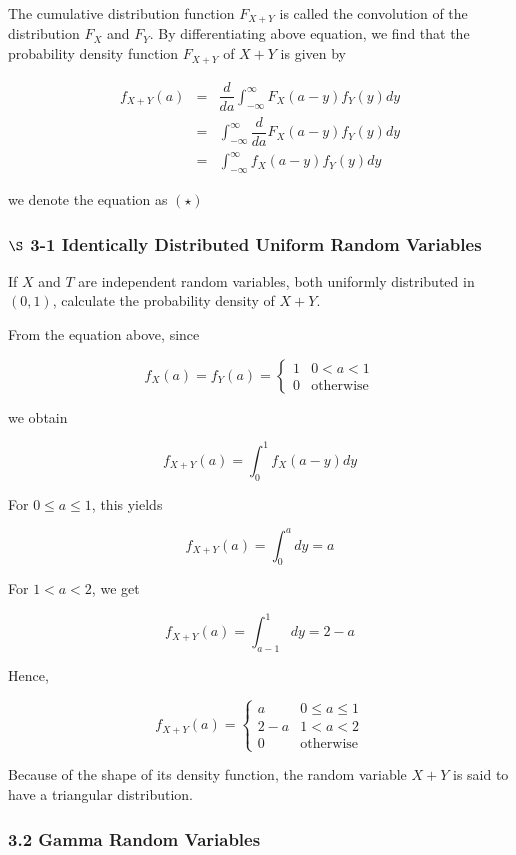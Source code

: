 The cumulative distribution function $F_{X+Y}$ is called the convolution of the distribution $F_X$ and $F_Y$. By differentiating above equation, we find that the probability density function $F_{X + Y}$ of $X + Y$ is given by

\begin{eqnarray*}
	f_{X+Y}(a) &=& \dfrac{d}{da}\int^{\infty}_{-\infty}F_X(a - y)f_Y(y)dy\\
	&=& \int^{\infty}_{-\infty}\dfrac{d}{da}F_X(a-y)f_Y(y)dy\\
	&=& \int^{\infty}_{-\infty}f_X(a-y)f_Y(y)dy
\end{eqnarray*}

we denote the equation as $(\star)$

\newpage

\subsubsection*{$\S$ 3-1 Identically Distributed Uniform Random Variables}

If $X$ and $T$ are independent random variables, both uniformly distributed in $(0,1)$, calculate the probability density of $X + Y$.

From the equation above, since

$$f_X(a) = f_Y(a) = \begin{cases}
	1 & 0 < a < 1\\
	0 & \text{otherwise}
\end{cases}$$

we obtain

$$f_{X + Y}(a) = \int^1_0 f_X(a - y)dy$$

For $0 \leq a \leq 1$, this yields

$$f_{X + Y}(a) = \int^a_0dy = a$$

For $1 < a < 2$, we get

$$f_{X + Y}(a) = \int^1_{a - 1}dy = 2-a$$

Hence,

$$f_{X + Y}(a) = \begin{cases}
	a & 0 \leq a \leq 1\\
	2 - a & 1 < a < 2\\
	0 & \text{otherwise}
\end{cases}$$

Because of the shape of its density function, the random variable $X + Y$ is said to have a triangular distribution.


\subsubsection*{3.2 Gamma Random Variables}

